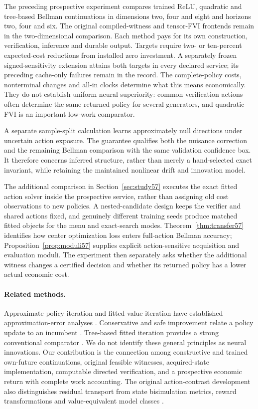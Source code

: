 The preceding prospective experiment compares trained ReLU, quadratic and tree-based Bellman continuations in dimensions two, four and eight and horizons two, four and six. The original compiled-witness and tensor-FVI frontends remain in the two-dimensional comparison. Each method pays for its own construction, verification, inference and durable output. Targets require two- or ten-percent expected-cost reductions from installed zero investment. A separately frozen signed-sensitivity extension attains both targets in every declared service; its preceding cache-only failures remain in the record. The complete-policy costs, nonterminal changes and all-in clocks determine what this means economically. They do not establish uniform neural superiority: common verification actions often determine the same returned policy for several generators, and quadratic FVI is an important low-work comparator.

A separate sample-split calculation learns approximately null directions under uncertain action exposure. The guarantee qualifies both the nuisance correction and the remaining Bellman comparison with the same validation confidence box. It therefore concerns inferred structure, rather than merely a hand-selected exact invariant, while retaining the maintained nonlinear drift and innovation model.

The additional comparison in Section~\ref{sec:study57} executes the exact fitted action solver inside the prospective service, rather than assigning old cost observations to new policies. A nested-candidate design keeps the verifier and shared actions fixed, and genuinely different training seeds produce matched fitted objects for the menu and exact-search modes. Theorem~\ref{thm:transfer57} identifies how center optimization loss enters full-action Bellman accuracy; Proposition~\ref{prop:moduli57} supplies explicit action-sensitive acquisition and evaluation moduli. The experiment then separately asks whether the additional witness changes a certified decision and whether its returned policy has a lower actual economic cost.

\paragraph{Related methods.}
Approximate policy iteration and fitted value iteration have established approximation-error analyses \citep{munos2003,munos2008,scherrer2015}. Conservative and safe improvement relate a policy update to an incumbent \citep{kakade2002,pirotta2013,metelli2021}. Tree-based fitted iteration provides a strong conventional comparator \citep{ernst2005}. We do not identify these general principles as neural innovations. Our contribution is the connection among constructive and trained own-future continuations, original feasible witnesses, acquired-state implementation, computable directed verification, and a prospective economic return with complete work accounting. The original action-contrast development also distinguishes residual transport from state bisimulation metrics, reward transformations and value-equivalent model classes \citep{ferns2004,ng1999,grimm2020}.


